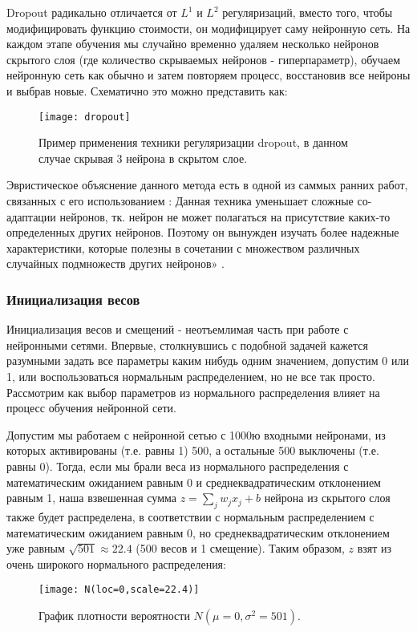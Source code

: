 Dropout радикально отличается от $L^1$ и $L^2$ регуляризаций, вместо того, чтобы 
модифицировать функцию стоимости, он модифицирует саму нейронную сеть. 
На каждом этапе обучения мы случайно временно удаляем несколько нейронов скрытого слоя 
(где количество скрываемых нейронов - гиперпараметр), обучаем нейронную сеть как обычно 
и затем повторяем процесс, восстановив все нейроны и выбрав новые. Схематично это 
можно представить как:
\begin{figure}[h!]
    \centering
    \texttt{[image: dropout]}
    \caption{Пример применения техники регуляризации dropout, в данном случае 
    скрывая 3 нейрона в скрытом слое.}
    \label{fig:dropout}
\end{figure}

Эвристическое объяснение данного метода есть в одной из саммых ранних работ, связанных 
с его использованием \cite{dropout}: Данная техника уменьшает сложные со-адаптации 
нейронов, тк. нейрон не может полагаться на присутствие каких-то определенных других 
нейронов. Поэтому он вынужден изучать более надежные характеристики, которые полезны 
в сочетании с множеством различных случайных подмножеств других нейронов» \cite{NN_Nielsen}.

\subsubsection{Инициализация весов}

Инициализация весов и смещений - неотъемлимая часть при работе с нейронными сетями. 
Впервые, столкнувшись с подобной задачей кажется разумными задать все параметры 
каким нибудь одним значением, допустим 0 или 1, или воспользоваться нормальным распределением, 
но не все так просто. Рассмотрим как выбор параметров из нормального распределения влияет 
на процесс обучения нейронной сети.

Допустим мы работаем с нейронной сетью с 1000ю входными нейронами, из которых 
активированы (т.е. равны 1) 500, а остальные 500 выключены (т.е. равны 0). 
Тогда, если мы брали веса из нормального распределения с математическим ожиданием равным 0 
и среднеквадратическим отклонением равным 1, наша взвешенная сумма 
$z = \sum_j w_j x_j + b$ нейрона из скрытого слоя также будет распределена, в соответствии 
с нормальным распределением с математическим ожиданием равным 0, но среднеквадратическим отклонением 
уже равным $\sqrt{501} \approx 22.4$ (500 весов и 1 смещение). Таким образом, $z$ взят из 
очень широкого нормального распределения:
\begin{figure}[h!]
    \centering
    \texttt{[image: N(loc=0,scale=22.4)]}
    \caption{График плотности вероятности $N(\mu=0, \sigma^2=501)$.}
    \label{fig:N_scale_22.4}
\end{figure}

